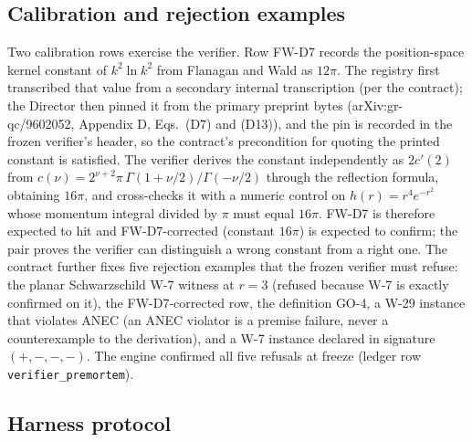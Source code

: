\documentclass[11pt]{article}
\begin{document}
\subsection{Calibration and rejection examples}

Two calibration rows exercise the verifier. Row FW-D7 records the position-space kernel constant of $k^2\ln k^2$ from Flanagan and Wald \cite{flanaganwald1996} as $12\pi$. The registry first transcribed that value from a secondary internal transcription (per the contract); the Director then pinned it from the primary preprint bytes (arXiv:gr-qc/9602052, Appendix D, Eqs.\ (D7) and (D13)), and the pin is recorded in the frozen verifier's header, so the contract's precondition for quoting the printed constant is satisfied. The verifier derives the constant independently as $2c'(2)$ from $c(\nu) = 2^{\nu+2}\pi\,\Gamma(1+\nu/2)/\Gamma(-\nu/2)$ through the reflection formula, obtaining $16\pi$, and cross-checks it with a numeric control on $h(r) = r^4 e^{-r^2}$ whose momentum integral divided by $\pi$ must equal $16\pi$. FW-D7 is therefore expected to hit and FW-D7-corrected (constant $16\pi$) is expected to confirm; the pair proves the verifier can distinguish a wrong constant from a right one. The contract further fixes five rejection examples that the frozen verifier must refuse: the planar Schwarzschild W-7 witness at $r=3$ (refused because W-7 is exactly confirmed on it), the FW-D7-corrected row, the definition GO-4, a W-29 instance that violates ANEC (an ANEC violator is a premise failure, never a counterexample to the derivation), and a W-7 instance declared in signature $(+,-,-,-)$. The engine confirmed all five refusals at freeze (ledger row \texttt{verifier\_premortem}).

\subsection{Harness protocol}
\label{sec:protocol}
\end{document}
